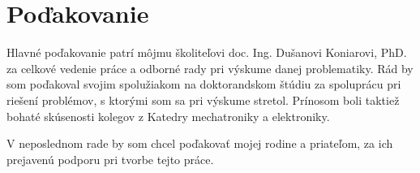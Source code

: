 \chapter*{Poďakovanie}

Hlavné poďakovanie patrí môjmu školiteľovi doc. Ing. Dušanovi Koniarovi, PhD. za celkové vedenie práce a odborné rady pri výskume danej problematiky. Rád by som poďakoval svojim spolužiakom na doktorandskom štúdiu za spoluprácu pri riešení problémov, s ktorými som sa pri výskume stretol. Prínosom boli taktiež bohaté skúsenosti kolegov z Katedry mechatroniky a  elektroniky.

V neposlednom rade by som chcel poďakovať mojej rodine a priateľom, za ich prejavenú podporu pri tvorbe tejto práce.

%
%
